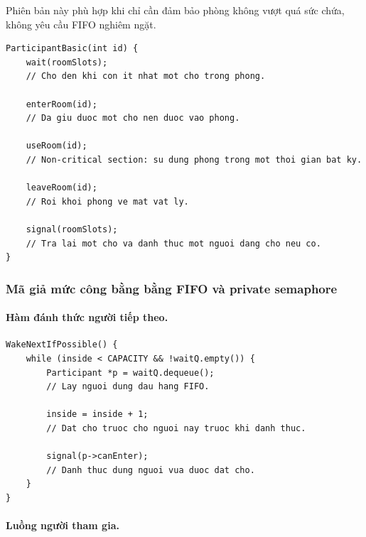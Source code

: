 Phiên bản này phù hợp khi chỉ cần đảm bảo phòng không vượt quá sức chứa,
không yêu cầu FIFO nghiêm ngặt.

\begin{lstlisting}
ParticipantBasic(int id) {
    wait(roomSlots);
    // Cho den khi con it nhat mot cho trong phong.

    enterRoom(id);
    // Da giu duoc mot cho nen duoc vao phong.

    useRoom(id);
    // Non-critical section: su dung phong trong mot thoi gian bat ky.

    leaveRoom(id);
    // Roi khoi phong ve mat vat ly.

    signal(roomSlots);
    // Tra lai mot cho va danh thuc mot nguoi dang cho neu co.
}
\end{lstlisting}

\subsubsection*{Mã giả mức công bằng bằng FIFO và private semaphore}

\paragraph{Hàm đánh thức người tiếp theo.}

\begin{lstlisting}
WakeNextIfPossible() {
    while (inside < CAPACITY && !waitQ.empty()) {
        Participant *p = waitQ.dequeue();
        // Lay nguoi dung dau hang FIFO.

        inside = inside + 1;
        // Dat cho truoc cho nguoi nay truoc khi danh thuc.

        signal(p->canEnter);
        // Danh thuc dung nguoi vua duoc dat cho.
    }
}
\end{lstlisting}

\paragraph{Luồng người tham gia.}


